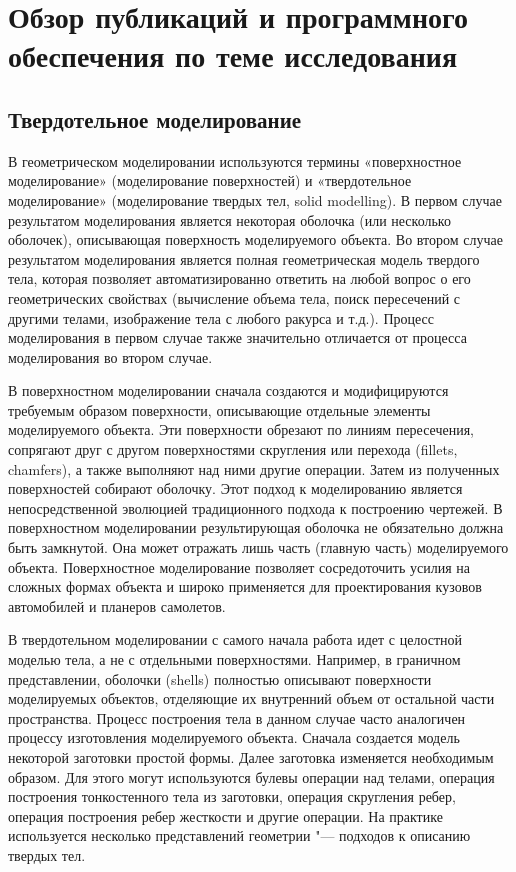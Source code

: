 \chapter{Обзор публикаций и программного обеспечения по теме исследования} \label{chapt1}


\section{Твердотельное моделирование} \label{solid_modeling}

В геометрическом моделировании используются термины «поверхностное моделирование» (моделирование поверхностей) и «твердотельное моделирование» (моделирование твердых тел, solid modelling). В первом случае результатом моделирования является некоторая оболочка (или несколько оболочек), описывающая поверхность моделируемого объекта. Во втором случае результатом моделирования является полная геометрическая модель твердого тела, которая позволяет автоматизированно ответить на любой вопрос о его геометрических свойствах (вычисление объема тела, поиск пересечений с другими телами, изображение тела с любого ракурса и т.д.). Процесс моделирования в первом случае также значительно отличается от процесса моделирования во втором случае.

В поверхностном моделировании сначала создаются и модифицируются требуемым образом поверхности, описывающие отдельные элементы моделируемого объекта. Эти поверхности обрезают по линиям пересечения, сопрягают друг с другом поверхностями скругления или перехода (fillets, chamfers), а также выполняют над ними другие операции. Затем из полученных поверхностей собирают оболочку. Этот подход к моделированию является непосредственной эволюцией традиционного подхода к построению чертежей. В поверхностном моделировании результирующая оболочка не обязательно должна быть замкнутой. Она может отражать лишь часть (главную часть) моделируемого объекта. Поверхностное моделирование позволяет сосредоточить усилия на сложных формах объекта и широко применяется для проектирования кузовов автомобилей и планеров самолетов.

В твердотельном моделировании с самого начала работа идет с целостной моделью тела, а не с отдельными поверхностями. Например, в граничном представлении, оболочки (shells) полностью описывают поверхности моделируемых объектов, отделяющие их внутренний объем от остальной части пространства. Процесс построения тела в данном случае часто аналогичен процессу изготовления моделируемого объекта. Сначала создается модель некоторой заготовки простой формы. Далее заготовка изменяется необходимым образом. Для этого могут используются булевы операции над телами, операция построения тонкостенного тела из заготовки, операция скругления ребер, операция построения ребер жесткости и другие операции. На практике используется несколько представлений геометрии "--- подходов к описанию твердых тел.

